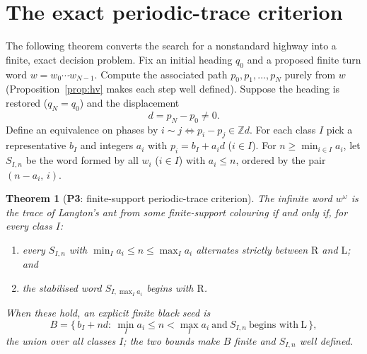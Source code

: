 \documentclass[11pt,reqno]{amsart}
\theoremstyle{plain}
\newtheorem{theorem}{Theorem}[section]
\theoremstyle{definition}
\newcommand{\Z}{\mathbb{Z}}
\newcommand{\drift}{d}
\newcommand{\turnR}{\mathrm{R}}
\newcommand{\turnL}{\mathrm{L}}
\newcommand{\PN}[1]{\textbf{P#1}}
\begin{document}
\section{The exact periodic-trace criterion}\label{sec:criterion}

The following theorem converts the search for a nonstandard highway into a
finite, exact decision problem. Fix an initial heading $q_0$ and a proposed
finite turn word $w=w_0\cdots w_{N-1}$. Compute the associated path
$p_0,p_1,\dots,p_N$ purely from $w$ (Proposition~\ref{prop:hv} makes each step
well defined). Suppose the heading is restored ($q_N=q_0$) and the displacement
\[
\drift=p_N-p_0\neq 0 .
\]
Define an equivalence on phases by $i\sim j\iff p_i-p_j\in\Z\drift$. For each
class $I$ pick a representative $b_I$ and integers $a_i$ with $p_i=b_I+a_i\drift$
($i\in I$). For $n\ge\min_{i\in I}a_i$, let $S_{I,n}$ be the word formed by all
$w_i$ ($i\in I$) with $a_i\le n$, ordered by the pair $(n-a_i,\,i)$.

\begin{theorem}[\PN{3}: finite-support periodic-trace criterion]\label{thm:criterion}
The infinite word $w^\omega$ is the trace of Langton's ant from some
finite-support colouring if and only if, for every class $I$:
\begin{enumerate}[label=\textup{(\roman*)}]
\item every $S_{I,n}$ with $\min_I a_i\le n\le\max_I a_i$ alternates strictly
between $\turnR$ and $\turnL$; and
\item the stabilised word $S_{I,\max_I a_i}$ begins with $\turnR$.
\end{enumerate}
When these hold, an explicit finite black seed is
\[
B=\bigl\{\,b_I+n\drift:\ \textstyle\min_I a_i\le n<\max_I a_i\ \text{and}\
S_{I,n}\ \text{begins with}\ \turnL\,\bigr\},
\]
the union over all classes $I$; the two bounds make $B$ finite and $S_{I,n}$
well defined.
\end{theorem}
\end{document}
